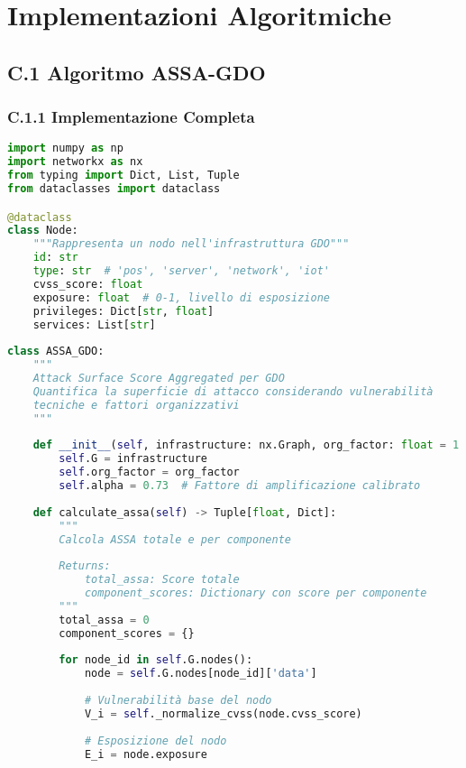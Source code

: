 
\chapter{Implementazioni Algoritmiche}
\label{app:algoritmi}

\section{C.1 Algoritmo ASSA-GDO}

\subsection{C.1.1 Implementazione Completa}

\begin{lstlisting}[language=Python, caption=Implementazione dell'algoritmo ASSA-GDO]
import numpy as np
import networkx as nx
from typing import Dict, List, Tuple
from dataclasses import dataclass

@dataclass
class Node:
    """Rappresenta un nodo nell'infrastruttura GDO"""
    id: str
    type: str  # 'pos', 'server', 'network', 'iot'
    cvss_score: float
    exposure: float  # 0-1, livello di esposizione
    privileges: Dict[str, float]
    services: List[str]
    
class ASSA_GDO:
    """
    Attack Surface Score Aggregated per GDO
    Quantifica la superficie di attacco considerando vulnerabilità
    tecniche e fattori organizzativi
    """
    
    def __init__(self, infrastructure: nx.Graph, org_factor: float = 1.0):
        self.G = infrastructure
        self.org_factor = org_factor
        self.alpha = 0.73  # Fattore di amplificazione calibrato
        
    def calculate_assa(self) -> Tuple[float, Dict]:
        """
        Calcola ASSA totale e per componente
        
        Returns:
            total_assa: Score totale
            component_scores: Dictionary con score per componente
        """
        total_assa = 0
        component_scores = {}
        
        for node_id in self.G.nodes():
            node = self.G.nodes[node_id]['data']
            
            # Vulnerabilità base del nodo
            V_i = self._normalize_cvss(node.cvss_score)
            
            # Esposizione del nodo
            E_i = node.exposure
            

\end{lstlisting}
